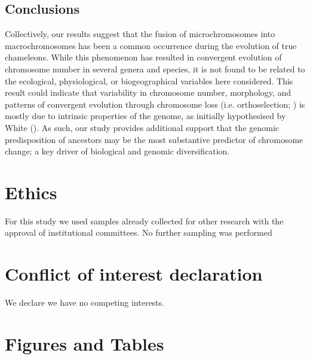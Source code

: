 \documentclass[a4paper, 12pt]{article}
\begin{document}
\subsection{Conclusions}
Collectively, our results suggest that the fusion of microchromosomes into macrochromosomes has been a common occurrence during the evolution of true chameleons. 
While this phenomenon has resulted in convergent evolution of chromosome number in several genera and species, it is not found to be related to the ecological, physiological, or biogeographical variables here considered. 
This result could indicate that variability in chromosome number, morphology, and patterns of convergent evolution through chromosome loss (i.e. orthoselection; \citealt{white1973}) is mostly due to intrinsic properties of the genome, as initially hypothesised by White (\citeyear{white1975chromosome}). 
As such, our study provides additional support that the genomic predisposition of ancestors may be the most substantive predictor of chromosome change; a key driver of biological and genomic diversification.

\section{Ethics}
For this study we used samples already collected for other research with the approval of institutional committees. No further sampling was performed

\section{Conflict of interest declaration}
We declare we have no competing interests.




\section{Figures and Tables}


\end{document}
